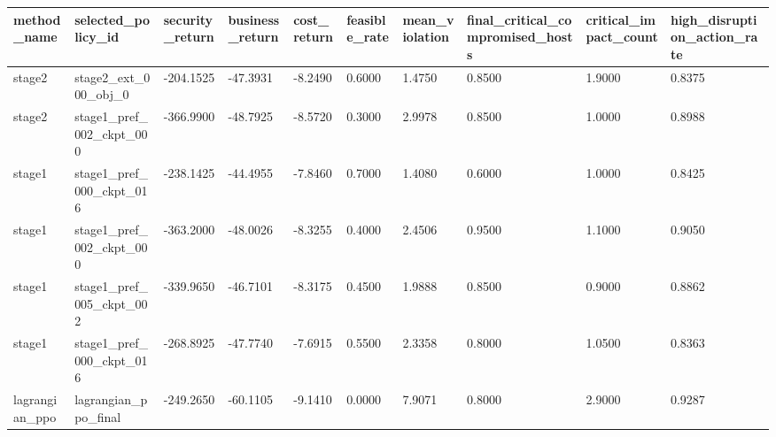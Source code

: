 \begin{tabular}{llllllllll}
\hline
method_name & selected_policy_id & security_return & business_return & cost_return & feasible_rate & mean_violation & final_critical_compromised_hosts & critical_impact_count & high_disruption_action_rate \\
\hline
stage2 & stage2_ext_000_obj_0 & -204.1525 & -47.3931 & -8.2490 & 0.6000 & 1.4750 & 0.8500 & 1.9000 & 0.8375 \\
stage2 & stage1_pref_002_ckpt_000 & -366.9900 & -48.7925 & -8.5720 & 0.3000 & 2.9978 & 0.8500 & 1.0000 & 0.8988 \\
stage1 & stage1_pref_000_ckpt_016 & -238.1425 & -44.4955 & -7.8460 & 0.7000 & 1.4080 & 0.6000 & 1.0000 & 0.8425 \\
stage1 & stage1_pref_002_ckpt_000 & -363.2000 & -48.0026 & -8.3255 & 0.4000 & 2.4506 & 0.9500 & 1.1000 & 0.9050 \\
stage1 & stage1_pref_005_ckpt_002 & -339.9650 & -46.7101 & -8.3175 & 0.4500 & 1.9888 & 0.8500 & 0.9000 & 0.8862 \\
stage1 & stage1_pref_000_ckpt_016 & -268.8925 & -47.7740 & -7.6915 & 0.5500 & 2.3358 & 0.8000 & 1.0500 & 0.8363 \\
lagrangian_ppo & lagrangian_ppo_final & -249.2650 & -60.1105 & -9.1410 & 0.0000 & 7.9071 & 0.8000 & 2.9000 & 0.9287 \\
\hline
\end{tabular}